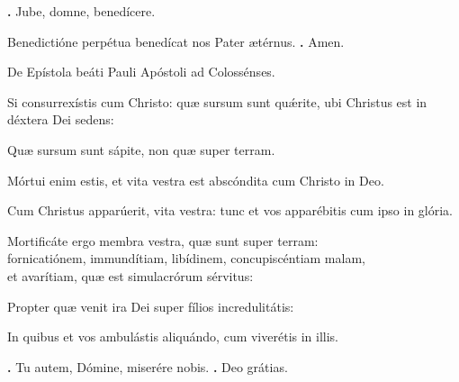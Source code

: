 \begin{small}
\textbf{\Vbar.} Jube, domne, benedícere.

Benedictióne perpétua benedícat nos Pater ætérnus. \textbf{\Rbar.} Amen.
\end{small}


De Epístola beáti Pauli Apóstoli ad Colossénses.

Si consurrexístis cum Christo: quæ sursum sunt qu\'{\ae}rite, ubi Christus est in déxtera Dei sedens:

Quæ sursum sunt sápite, non quæ super terram.

Mórtui enim estis, et vita vestra est abscóndita cum Christo in Deo.

Cum Christus apparúerit, vita vestra: tunc et vos apparébitis cum ipso in glória.

Mortificáte ergo membra vestra, quæ sunt super terram: \\
fornicatiónem, immundítiam, libídinem, concupiscéntiam malam, \\
et avarítiam, quæ est simulacrórum sérvitus:

Propter quæ venit ira Dei super fílios incredulitátis:

In quibus et vos ambulástis aliquándo, cum viverétis in illis.

\textbf{\Vbar.} Tu autem, Dómine, miserére nobis.
\textbf{\Rbar.} Deo grátias.

